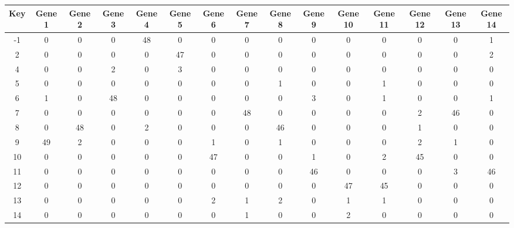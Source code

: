 \begin{tabular}{|c|c|c|c|c|c|c|c|c|c|c|c|c|c|c|}
\hline
Key & Gene 1 & Gene 2 & Gene 3 & Gene 4 & Gene 5 & Gene 6 & Gene 7 & Gene 8 & Gene 9 & Gene 10 & Gene 11 & Gene 12 & Gene 13 & Gene 14 \\
\hline
-1 & 0 & 0 & 0 & 48 & 0 & 0 & 0 & 0 & 0 & 0 & 0 & 0 & 0 & 1 \\
2 & 0 & 0 & 0 & 0 & 47 & 0 & 0 & 0 & 0 & 0 & 0 & 0 & 0 & 2 \\
4 & 0 & 0 & 2 & 0 & 3 & 0 & 0 & 0 & 0 & 0 & 0 & 0 & 0 & 0 \\
5 & 0 & 0 & 0 & 0 & 0 & 0 & 0 & 1 & 0 & 0 & 1 & 0 & 0 & 0 \\
6 & 1 & 0 & 48 & 0 & 0 & 0 & 0 & 0 & 3 & 0 & 1 & 0 & 0 & 1 \\
7 & 0 & 0 & 0 & 0 & 0 & 0 & 48 & 0 & 0 & 0 & 0 & 2 & 46 & 0 \\
8 & 0 & 48 & 0 & 2 & 0 & 0 & 0 & 46 & 0 & 0 & 0 & 1 & 0 & 0 \\
9 & 49 & 2 & 0 & 0 & 0 & 1 & 0 & 1 & 0 & 0 & 0 & 2 & 1 & 0 \\
10 & 0 & 0 & 0 & 0 & 0 & 47 & 0 & 0 & 1 & 0 & 2 & 45 & 0 & 0 \\
11 & 0 & 0 & 0 & 0 & 0 & 0 & 0 & 0 & 46 & 0 & 0 & 0 & 3 & 46 \\
12 & 0 & 0 & 0 & 0 & 0 & 0 & 0 & 0 & 0 & 47 & 45 & 0 & 0 & 0 \\
13 & 0 & 0 & 0 & 0 & 0 & 2 & 1 & 2 & 0 & 1 & 1 & 0 & 0 & 0 \\
14 & 0 & 0 & 0 & 0 & 0 & 0 & 1 & 0 & 0 & 2 & 0 & 0 & 0 & 0 \\
\hline
\end{tabular}